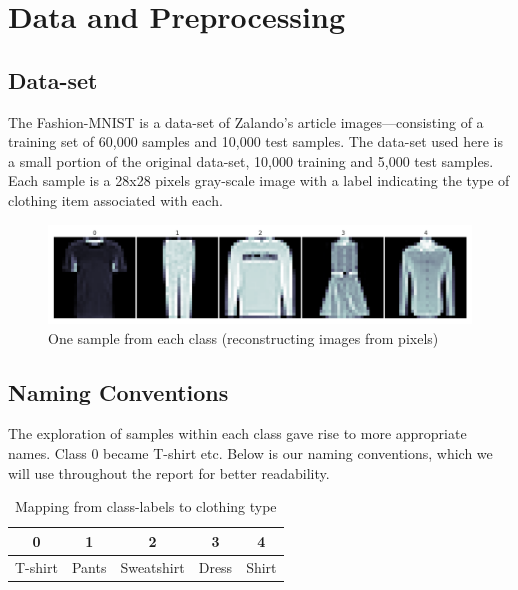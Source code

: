 \section{Data and Preprocessing}
\subsection{Data-set}
The Fashion-MNIST is a data-set of Zalando's article images—consisting of a training set of 60,000 samples and 10,000 test samples. The data-set used here is a small portion of the original data-set, 10,000 training and 5,000 test samples. Each sample is a 28x28 pixels gray-scale image with a label indicating the type of clothing item associated with each. 
\newline

\begin{figure}[ht]
\centering
\includegraphics[scale=0.45]{figures_for_report/samples_from_classes}
\captionsetup{justification=centering,margin=2cm}
\caption{One sample from each class (reconstructing images from pixels)}
\end{figure}
\subsection{Naming Conventions}
The exploration of samples within each class gave rise to more appropriate names. Class 0 became T-shirt etc. Below is our naming conventions, which we will use throughout the report for better readability.  \\
\begin{table}[!ht]
  \footnotesize
  \centering
\begin{tabular}{ c c c c c }
 \toprule
 \textbf{0} & \textbf{1} & \textbf{2} & \textbf{3} & \textbf{4} \\ 
 \midrule 
 T-shirt & Pants & Sweatshirt & Dress & Shirt \\ 
 \bottomrule
\end{tabular} \\[0.2cm]
\captionsetup{justification=centering,margin=2cm}
\caption{Mapping from class-labels to clothing type}
\label{features}
\end{table}


